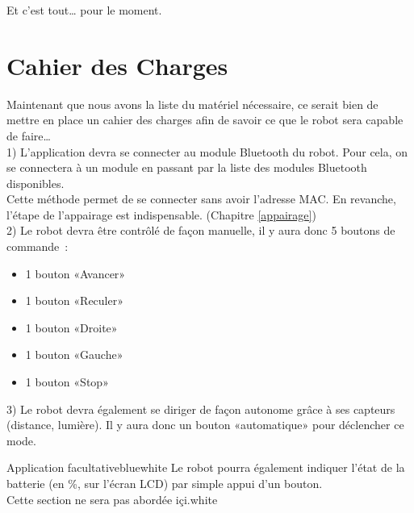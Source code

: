 Et c'est tout… pour le moment.


\section{Cahier des Charges}

Maintenant que nous avons la liste du matériel nécessaire, ce serait bien de mettre en place un cahier des charges afin de savoir ce que le robot sera capable de faire… \\

1) L'application devra se connecter au module Bluetooth du robot.
Pour cela, on se connectera  à un module en passant par la liste des modules Bluetooth disponibles.\\
Cette méthode permet de se connecter sans avoir l'adresse MAC. En revanche, l'étape de l'appairage est indispensable. (Chapitre \ref{appairage}) \\

2) Le robot devra être contrôlé de façon manuelle,  il y aura donc 5 boutons de commande :

\begin{itemize}
    \item 1 bouton «Avancer»
    \item 1 bouton «Reculer»
    \item 1 bouton «Droite»
    \item 1 bouton «Gauche»
    \item 1 bouton «Stop»
\end{itemize}


3) Le robot devra également se diriger de façon autonome grâce à ses capteurs (distance, lumière). Il y aura donc un bouton «automatique» pour déclencher ce mode. \\

\begin{messageBox}{Application facultative}{blue}{white}{ Le robot pourra également indiquer l'état de la batterie (en \%, sur l'écran LCD) par simple appui d'un bouton. \\ Cette section ne sera pas abordée içi.}{white}
\end{messageBox}

